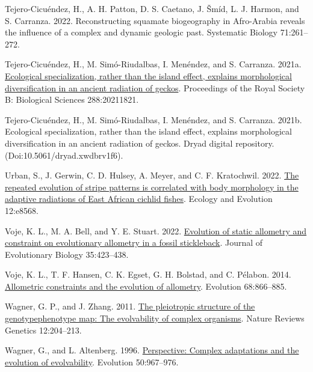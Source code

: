 \documentclass[
  11pt,
]{article}
\newlength{\cslhangindent}
\newlength{\cslentryspacingunit} %
\newenvironment{CSLReferences}[2] %
 {%
  \setlength{\parindent}{0pt}
  \ifodd #1
  \let\oldpar\par
  \def\par{\hangindent=\cslhangindent\oldpar}
  \fi
  \setlength{\parskip}{#2\cslentryspacingunit}
 }%
 {}
\begin{document}
\begin{CSLReferences}{1}{0}
\leavevmode{}%
Tejero-Cicuéndez, H., A. H. Patton, D. S. Caetano, J. Šmíd, L. J.
Harmon, and S. Carranza. 2022. Reconstructing squamate biogeography in
{A}fro-{A}rabia reveals the influence of a complex and dynamic geologic
past. Systematic Biology 71:261--272.

\leavevmode{}%
Tejero-Cicuéndez, H., M. Simó-Riudalbas, I. Menéndez, and S. Carranza.
2021a. \href{https://doi.org/10.1098/rspb.2021.1821}{Ecological
specialization, rather than the island effect, explains morphological
diversification in an ancient radiation of geckos}. Proceedings of the
Royal Society B: Biological Sciences 288:20211821.

\leavevmode{}%
Tejero-Cicuéndez, H., M. Simó-Riudalbas, I. Menéndez, and S. Carranza.
2021b. Ecological specialization, rather than the island effect,
explains morphological diversification in an ancient radiation of
geckos. Dryad digital repository. (Doi:10.5061/dryad.xwdbrv1f6).

\leavevmode{}%
Urban, S., J. Gerwin, C. D. Hulsey, A. Meyer, and C. F. Kratochwil.
2022. \href{https://doi.org/10.1002/ece3.8568}{The repeated evolution of
stripe patterns is correlated with body morphology in the adaptive
radiations of {E}ast {A}frican cichlid fishes}. Ecology and Evolution
12:e8568.

\leavevmode{}%
Voje, K. L., M. A. Bell, and Y. E. Stuart. 2022.
\href{https://doi.org/10.1111/jeb.13984}{Evolution of static allometry
and constraint on evolutionary allometry in a fossil stickleback}.
Journal of Evolutionary Biology 35:423--438.

\leavevmode{}%
Voje, K. L., T. F. Hansen, C. K. Egset, G. H. Bolstad, and C. Pélabon.
2014. \href{https://doi.org/10.1111/evo.12312}{Allometric constraints
and the evolution of allometry}. Evolution 68:866--885.

\leavevmode{}%
Wagner, G. P., and J. Zhang. 2011.
\href{https://doi.org/10.1038/nrg2949}{The pleiotropic structure of the
genotype{\textendash}phenotype map: The evolvability of complex
organisms}. Nature Reviews Genetics 12:204--213.

\leavevmode{}%
Wagner, G., and L. Altenberg. 1996.
\href{https://doi.org/10.1111/j.1558-5646.1996.tb02339.x}{Perspective:
Complex adaptations and the evolution of evolvability}. Evolution
50:967--976.


\end{CSLReferences}
\end{document}
